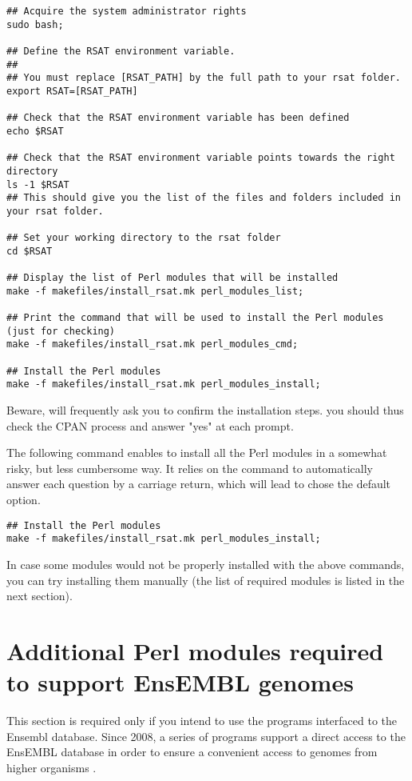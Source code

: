 \documentclass[12pt,a4paper, oneside]{scrreprt} %
\begin{document}
\begin{lstlisting}
## Acquire the system administrator rights
sudo bash;

## Define the RSAT environment variable.
##
## You must replace [RSAT_PATH] by the full path to your rsat folder.
export RSAT=[RSAT_PATH]

## Check that the RSAT environment variable has been defined
echo $RSAT

## Check that the RSAT environment variable points towards the right directory
ls -1 $RSAT
## This should give you the list of the files and folders included in your rsat folder.

## Set your working directory to the rsat folder
cd $RSAT

## Display the list of Perl modules that will be installed
make -f makefiles/install_rsat.mk perl_modules_list;

## Print the command that will be used to install the Perl modules (just for checking)
make -f makefiles/install_rsat.mk perl_modules_cmd;

## Install the Perl modules
make -f makefiles/install_rsat.mk perl_modules_install;
\end{lstlisting}

Beware,  will frequently ask you to confirm the
installation steps. you should thus check the CPAN process and answer
"yes" at each prompt.

The following command enables to install all the Perl modules in a
somewhat risky, but less cumbersome way. It relies on the command
 to automatically answer each question by a carriage
return, which will lead  to chose the default option.

\begin{lstlisting}
## Install the Perl modules
make -f makefiles/install_rsat.mk perl_modules_install;
\end{lstlisting}

In case some modules would not be properly installed with the above
commands, you can try installing them manually (the list of required
modules is listed in the next section).


\section{Additional Perl modules required to support EnsEMBL genomes}
\label{sect:ensembl_libraries}

This section is required only if you intend to use the \RSAT programs
interfaced to the Ensembl database.  Since 2008, a series of \RSAT
programs support a direct access to the EnsEMBL database in order to
ensure a convenient access to genomes from higher organisms
\cite{Sand:2009}.
\end{document}
